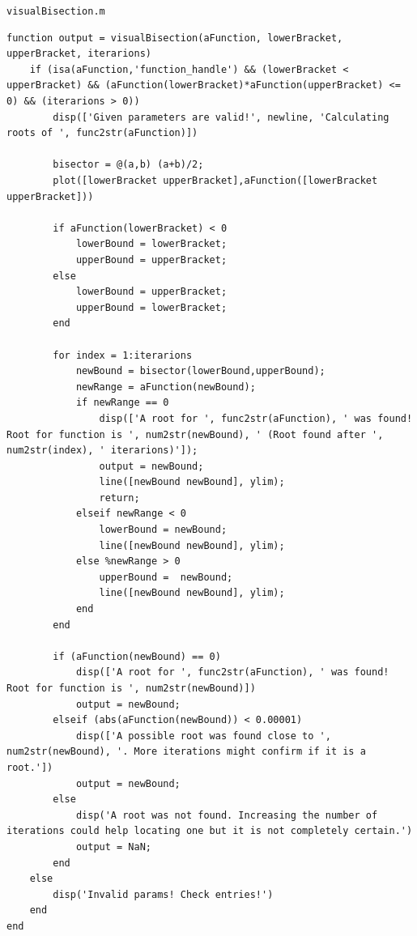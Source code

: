 \documentclass[english,notitlepage,letterpaper, 10pt]{article} %
\begin{document}
\texttt{visualBisection.m}
\begin{lstlisting}
function output = visualBisection(aFunction, lowerBracket, upperBracket, iterarions)
    if (isa(aFunction,'function_handle') && (lowerBracket < upperBracket) && (aFunction(lowerBracket)*aFunction(upperBracket) <= 0) && (iterarions > 0))
        disp(['Given parameters are valid!', newline, 'Calculating roots of ', func2str(aFunction)])

        bisector = @(a,b) (a+b)/2;
        plot([lowerBracket upperBracket],aFunction([lowerBracket upperBracket]))
        
        if aFunction(lowerBracket) < 0
            lowerBound = lowerBracket;
            upperBound = upperBracket;
        else
            lowerBound = upperBracket;
            upperBound = lowerBracket;
        end
        
        for index = 1:iterarions
            newBound = bisector(lowerBound,upperBound);
            newRange = aFunction(newBound);
            if newRange == 0
                disp(['A root for ', func2str(aFunction), ' was found! Root for function is ', num2str(newBound), ' (Root found after ', num2str(index), ' iterarions)']);
                output = newBound;
                line([newBound newBound], ylim);
                return;
            elseif newRange < 0
                lowerBound = newBound;
                line([newBound newBound], ylim);
            else %newRange > 0
                upperBound =  newBound;
                line([newBound newBound], ylim);
            end
        end

        if (aFunction(newBound) == 0)
            disp(['A root for ', func2str(aFunction), ' was found! Root for function is ', num2str(newBound)])
            output = newBound;
        elseif (abs(aFunction(newBound)) < 0.00001)
            disp(['A possible root was found close to ', num2str(newBound), '. More iterations might confirm if it is a root.'])
            output = newBound;
        else
            disp('A root was not found. Increasing the number of iterations could help locating one but it is not completely certain.')
            output = NaN;
        end
    else    
        disp('Invalid params! Check entries!')
    end
end
\end{lstlisting}
\end{document}
